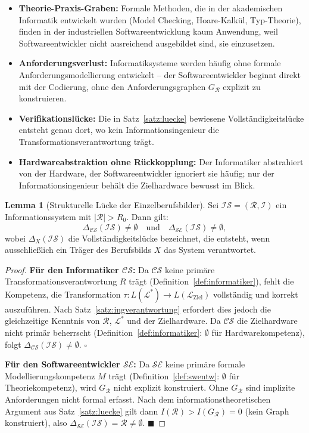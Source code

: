 ﻿\documentclass[a4paper,12pt]{article}
\theoremstyle{definition}
\newtheorem{lemma}{Lemma}
\begin{document}
\begin{itemize}
  \item \textbf{Theorie-Praxis-Graben:} Formale Methoden, die in der akademischen
        Informatik entwickelt wurden (Model Checking, Hoare-Kalkül, Typ-Theorie),
        finden in der industriellen Softwareentwicklung kaum Anwendung,
        weil Softwareentwickler nicht ausreichend ausgebildet sind, sie einzusetzen.
  \item \textbf{Anforderungsverlust:} Informatiksysteme werden häufig ohne
        formale Anforderungsmodellierung entwickelt -- der Softwareentwickler
        beginnt direkt mit der Codierung, ohne den Anforderungsgraphen
        $G_\mathcal{R}$ explizit zu konstruieren.
  \item \textbf{Verifikationslücke:} Die in Satz~\ref{satz:luecke} bewiesene
        Vollständigkeitslücke entsteht genau dort, wo kein Informationsingenieur
        die Transformationsverantwortung trägt.
  \item \textbf{Hardwareabstraktion ohne Rückkopplung:} Der Informatiker abstrahiert
        von der Hardware, der Softwareentwickler ignoriert sie häufig; nur der
        Informationsingenieur behält die Zielhardware bewusst im Blick.
\end{itemize}

\begin{lemma}[Strukturelle Lücke der Einzelberufsbilder]
\label{lem:luecke_berufe}
Sei $\mathcal{IS} = (\mathcal{R}, \mathcal{I})$ ein Informationssystem mit
$|\mathcal{R}| > R_0$. Dann gilt:
\[
  \Delta_{\mathcal{CS}}(\mathcal{IS}) \neq \emptyset
  \quad \text{und} \quad
  \Delta_{\mathcal{SE}}(\mathcal{IS}) \neq \emptyset,
\]
wobei $\Delta_X(\mathcal{IS})$ die Vollständigkeitslücke bezeichnet, die entsteht,
wenn ausschließlich ein Träger des Berufsbilds $X$ das System verantwortet.
\end{lemma}

\begin{proof}
\textbf{Für den Informatiker $\mathcal{CS}$:}
Da $\mathcal{CS}$ keine primäre Transformationsverantwortung $R$ trägt
(Definition~\ref{def:informatiker}), fehlt die Kompetenz, die Transformation
$\tau: L(\mathcal{L}^*) \to L(\mathcal{L}_{\text{Ziel}})$ vollständig und korrekt
auszuführen. Nach Satz~\ref{satz:ingverantwortung} erfordert dies jedoch die
gleichzeitige Kenntnis von $\mathcal{R}$, $\mathcal{L}^*$ und der Zielhardware.
Da $\mathcal{CS}$ die Zielhardware nicht primär beherrscht
(Definition~\ref{def:informatiker}: $\emptyset$ für Hardwarekompetenz), folgt
$\Delta_{\mathcal{CS}}(\mathcal{IS}) \neq \emptyset$. $\square$

\textbf{Für den Softwareentwickler $\mathcal{SE}$:}
Da $\mathcal{SE}$ keine primäre formale Modellierungskompetenz $M$ trägt
(Definition~\ref{def:swentw}: $\emptyset$ für Theoriekompetenz), wird
$G_\mathcal{R}$ nicht explizit konstruiert. Ohne $G_\mathcal{R}$ sind
implizite Anforderungen nicht formal erfasst. Nach dem informationstheoretischen
Argument aus Satz~\ref{satz:luecke} gilt dann
$I(\mathcal{R}) > I(G_\mathcal{R}) = 0$ (kein Graph konstruiert), also
$\Delta_{\mathcal{SE}}(\mathcal{IS}) = \mathcal{R} \neq \emptyset$. $\blacksquare$
\end{proof}
\end{document}
